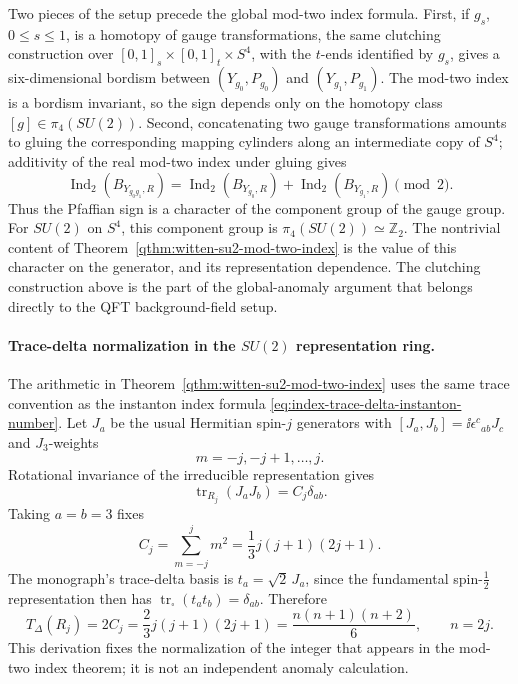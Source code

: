 Two pieces of the setup precede the global mod-two index formula.  First, if
\(g_s\), \(0\leq s\leq1\), is a homotopy of gauge
transformations, the same clutching construction over
\([0,1]_s\times[0,1]_t\times S^4\), with the \(t\)-ends identified by
\(g_s\), gives a six-dimensional bordism between
\((Y_{g_0},P_{g_0})\) and \((Y_{g_1},P_{g_1})\).  The mod-two index is a
bordism invariant, so the sign depends only on the homotopy class
\([g]\in\pi_4(SU(2))\).  Second, concatenating two gauge transformations
amounts to gluing the corresponding mapping cylinders along an intermediate
copy of \(S^4\); additivity of the real mod-two index under gluing gives
\begin{equation}
  \operatorname{Ind}_2(B_{Y_{g_0g_1},R})
  =
  \operatorname{Ind}_2(B_{Y_{g_0},R})
  +
  \operatorname{Ind}_2(B_{Y_{g_1},R})
  \pmod2 .
  \label{eq:witten-su2-mapping-torus-additivity}
\end{equation}
Thus the Pfaffian sign is a character of the component group of the gauge
group.  For \(SU(2)\) on \(S^4\), this component group is
\(\pi_4(SU(2))\simeq\mathbb Z_2\).  The nontrivial content of
Theorem~\ref{qthm:witten-su2-mod-two-index} is the value of this character on
the generator, and its representation dependence.  The clutching construction
above is the part of the global-anomaly argument that belongs directly to the
QFT background-field setup.

\paragraph{Trace-delta normalization in the \(SU(2)\) representation ring.}
The arithmetic in Theorem~\ref{qthm:witten-su2-mod-two-index} uses the same
trace convention as the instanton index formula
\eqref{eq:index-trace-delta-instanton-number}.  Let \(J_a\) be the usual
Hermitian spin-\(j\) generators with
\([J_a,J_b]=\ii\epsilon^c{}_{ab}J_c\) and \(J_3\)-weights
\[
  m=-j,-j+1,\ldots,j .
\]
Rotational invariance of the irreducible representation gives
\[
  \operatorname{tr}_{R_j}(J_aJ_b)=C_j\delta_{ab}.
\]
Taking \(a=b=3\) fixes
\begin{equation}
  C_j
  =
  \sum_{m=-j}^{j}m^2
  =
  \frac13j(j+1)(2j+1).
  \label{eq:su2-spin-j-half-trace-index}
\end{equation}
The monograph's trace-delta basis is \(t_a=\sqrt2\,J_a\), since the
fundamental spin-\(\frac12\) representation then has
\(\operatorname{tr}_{\square}(t_at_b)=\delta_{ab}\).  Therefore
\begin{equation}
  T_\Delta(R_j)
  =
  2C_j
  =
  \frac23j(j+1)(2j+1)
  =
  \frac{n(n+1)(n+2)}6,
  \qquad n=2j .
  \label{eq:su2-spin-j-trace-delta-derived}
\end{equation}
This derivation fixes the normalization of the integer that appears in the
mod-two index theorem; it is not an independent anomaly calculation.

